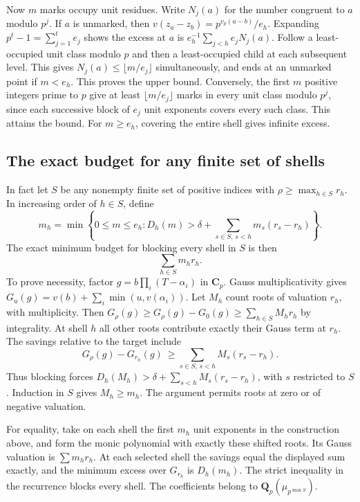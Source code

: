 Now $m$ marks occupy unit residues. Write $N_j(a)$ for the number
congruent to $a$ modulo $p^j$. If $a$ is unmarked, then
$v(z_a-z_b)=p^{v_p(a-b)}/e_h$. Expanding $p^t-1=\sum_{j=1}^t e_j$
shows the excess at $a$ is $e_h^{-1}\sum_{j<h} e_jN_j(a)$.
Follow a least-occupied unit class modulo $p$ and then a least-occupied
child at each subsequent level. This gives
$N_j(a)\le\lfloor m/e_j\rfloor$ simultaneously, and ends at an unmarked
point if $m<e_h$. This proves the upper bound. Conversely, the first $m$
positive integers prime to $p$ give at least $\lfloor m/e_j\rfloor$
marks in every unit class modulo $p^j$, since each successive block of
$e_j$ unit exponents covers every such class. This attains the bound.
For $m\ge e_h$, covering the entire shell gives infinite excess.

\subsection{The exact budget for any finite set of shells}
In fact let $S$ be any nonempty finite set of positive indices with
$\rho\ge\max_{h\in S}r_h$. In increasing order of $h\in S$, define
\[
  m_h=\min\left\{0\le m\le e_h:
  D_h(m)>\delta+\sum_{s\in S,\,s<h}m_s(r_s-r_h)\right\}.
\]
The exact minimum budget for blocking every shell in $S$ is then
\[
                           \sum_{h\in S}m_hr_h.                 \tag{*}
\]
To prove necessity, factor $g=b\prod_i(T-\alpha_i)$ in $\mathbf C_p$.
Gauss multiplicativity gives
$G_u(g)=v(b)+\sum_i\min(u,v(\alpha_i))$. Let $M_h$ count roots of
valuation $r_h$, with multiplicity. Then
$G_\rho(g)\ge G_\rho(g)-G_0(g)\ge\sum_{h\in S}M_hr_h$ by integrality.
At shell $h$ all other roots contribute exactly their Gauss term at $r_h$.
The savings relative to the target include
\[
 G_\rho(g)-G_{r_h}(g)\ \ge\sum_{s\in S,\,s<h} M_s(r_s-r_h).
\]
Thus blocking forces $D_h(M_h)>\delta+\sum_{s<h}M_s(r_s-r_h)$, with
$s$ restricted to $S$. Induction in $S$ gives $M_h\ge m_h$. The
argument permits roots at zero or of negative valuation.

For equality, take on each shell the first $m_h$ unit exponents in the
construction above, and form the monic polynomial with exactly these
shifted roots. Its Gauss valuation is $\sum m_hr_h$. At each selected
shell the savings equal the displayed sum exactly, and the minimum
excess over $G_{r_h}$ is $D_h(m_h)$. The strict inequality in the
recurrence blocks every shell. The coefficients belong to
$\mathbf Q_p(\mu_{p^{\max S}})$.

